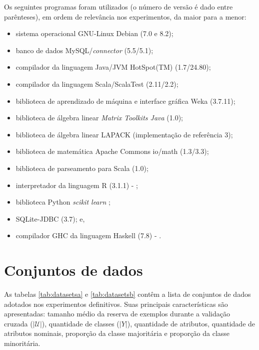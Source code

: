 \documentclass[doutorado, pos-defesa, spanish, english, brazil, versalete, sumario=tradicional]{packages/icmc}
\begin{document}
\begin{apendicesenv}
Os seguintes programas foram utilizados (o número de versão é dado entre parênteses), em ordem de relevância nos experimentos, da maior para a menor:
\begin{itemize}
   \item sistema operacional GNU-Linux Debian (7.0 e 8.2);
   \item banco de dados MySQL/\textit{connector} (5.5/5.1);
   \item compilador da linguagem Java/JVM HotSpot(TM) (1.7/24.80);
   \item compilador da linguagem Scala/ScalaTest (2.11/2.2);
   \item biblioteca de aprendizado de máquina e interface gráfica Weka (3.7.11);
   \item biblioteca de álgebra linear \textit{Matrix Toolkits Java} (1.0);
   \item biblioteca de álgebra linear LAPACK (implementação de referência 3);
   \item biblioteca de matemática Apache Commons io/math (1.3/3.3);
   \item biblioteca de parseamento para Scala (1.0);
   \item interpretador da linguagem R (3.1.1) - \cite{team2014r}; 
   \item biblioteca Python \textit{scikit learn} \cite{scikit-learn};
   \item SQLite-JDBC (3.7); e,
   \item compilador GHC da linguagem Haskell (7.8) - \cite{jones2003haskell}.
\end{itemize}

\chapter{Conjuntos de dados} \label{apdatasets}
As tabelas \ref{tab:datasetsa} e \ref{tab:datasetsb} contêm a lista de conjuntos de dados adotados nos experimentos definitivos.
Suas principais características são apresentadas: tamanho médio da reserva de exemplos durante a validação cruzada ($|\mathcal{U}|$), quantidade de classes ($|Y|$), quantidade de atributos, quantidade de atributos nominais, proporção da classe majoritária e proporção da classe minoritária.

% 
% 
\end{apendicesenv}
\end{document}
